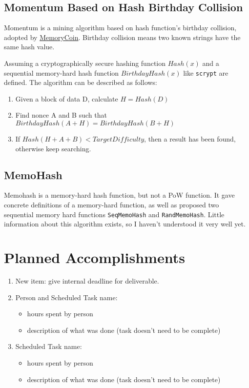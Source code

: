 \documentclass[11pt]{article}
\begin{document}
\subsection{Momentum Based on Hash Birthday Collision}

Momentum is a mining algorithm based on hash function's birthday collision, adopted by \href{hhttp://memorycoin.org/}{MemoryCoin}. Birthday collision means two known strings have the same hash value. 

Assuming a cryptographically secure hashing function $Hash(x)$ and a sequential memory-hard hash function $BirthdayHash(x)$ like \texttt{scrypt} are defined. The algorithm can be described as follows:

\begin{enumerate}
\item Given a block of data D, calculate $H=Hash(D)$
\item Find nonce A and B such that $BirthdayHash(A+H)=BirthdayHash(B+H)$
\item If $Hash(H+A+B)<TargetDifficulty$, then a result has been found, otherwise keep searching.
\end{enumerate}

\subsection{MemoHash}

Memohash\cite{memohash} is a memory-hard hash function, but not a PoW function. It gave concrete definitions of a memory-hard function, as well as proposed two sequential memory hard functions \texttt{SeqMemoHash} and \texttt{RandMemoHash}.
Little information about this algorithm exists, so I haven't understood it very well yet.


\section{Planned Accomplishments}
\begin{enumerate}
\item New item: give internal deadline for deliverable.
\item Person and Scheduled Task name:
   \begin{itemize}
      \item hours spent by person
      \item description of what was done (task doesn't need to be complete)
   \end{itemize}
\item Scheduled Task name:
   \begin{itemize}
      \item hours spent by person
      \item description of what was done (task doesn't need to be complete)
   \end{itemize}
\end{enumerate}
\end{document}
